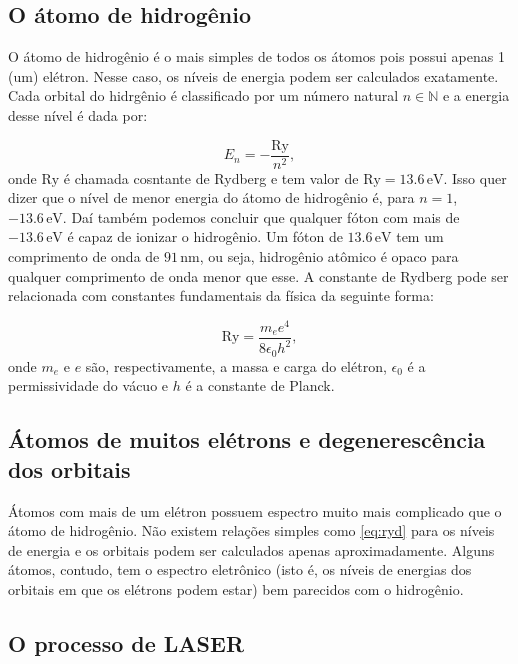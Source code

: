 \documentclass{article}
\begin{document}
\subsection{O \'atomo de hidrog\^enio}

O \'atomo de hidrog\^enio \'e o mais simples de todos os \'atomos pois possui apenas 1 (um) el\'etron. Nesse caso, os n\'iveis de energia podem ser calculados exatamente. Cada orbital do hidrg\^enio \'e classificado por um n\'umero natural $n\in \mathbb{N}$ e a energia desse n\'ivel \'e dada por:

\begin{equation}\label{eq:ryd}
E_n = -\frac{\text{Ry}}{n^2},
\end{equation}
onde $\text{Ry}$ \'e chamada cosntante de Rydberg e tem valor de $\text{Ry}=13.6\,\text{eV}$. Isso quer dizer que o n\'ivel de menor energia do \'atomo de hidrog\^enio \'e, para $n=1$, $-13.6\,\text{eV}$. Da\'i tamb\'em podemos concluir que qualquer f\'oton com mais de $-13.6\,\text{eV}$ \'e capaz de ionizar o hidrog\^enio. Um f\'oton de $13.6\,\text{eV}$ tem um comprimento de onda de $91\,\text{nm}$, ou seja, hidrog\^enio at\^omico \'e opaco para qualquer comprimento de onda menor que esse. A constante de Rydberg pode ser relacionada com constantes fundamentais da f\'isica da seguinte forma:

\begin{equation}
\text{Ry} = \frac{m_ee^4}{8\epsilon_0h^2},
\end{equation}
onde $m_e$ e $e$ s\~ao, respectivamente, a massa e carga do el\'etron, $\epsilon_0$ \'e a permissividade do v\'acuo e $h$ \'e a constante de Planck.

\subsection{\'Atomos de muitos el\'etrons e degeneresc\^encia dos orbitais}

\'Atomos com mais de um el\'etron possuem espectro muito mais complicado que o \'atomo de hidrog\^enio. N\~ao existem rela\c c\~oes simples como \eqref{eq:ryd} para os n\'iveis de energia e os orbitais podem ser calculados apenas aproximadamente. Alguns \'atomos, contudo, tem o espectro eletr\^onico (isto \'e, os n\'iveis de energias dos orbitais em que os el\'etrons podem estar) bem parecidos com o hidrog\^enio. 
\subsection{O processo de LASER}
\end{document}

